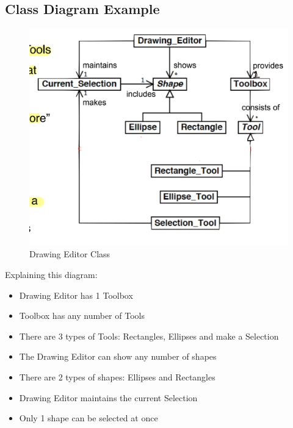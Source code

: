 \documentclass{article}
\begin{document}
\subsection{Class Diagram Example}
\begin{figure}[H]
\centering
\includegraphics[width = 0.5\linewidth]{Pictures/Screenshot 2023-01-27 at 12.41.28.png}
\caption{Drawing Editor Class}
\end{figure}
Explaining this diagram:
\begin{itemize}
    \item Drawing Editor has 1 Toolbox
    \item Toolbox has any number of Tools
    \item There are 3 types of Tools: Rectangles, Ellipses and make a Selection
    \item The Drawing Editor can show any number of shapes
    \item There are 2 types of shapes: Ellipses and Rectangles
    \item Drawing Editor maintains the current Selection
    \item Only 1 shape can be selected at once
\end{itemize}
\end{document}
